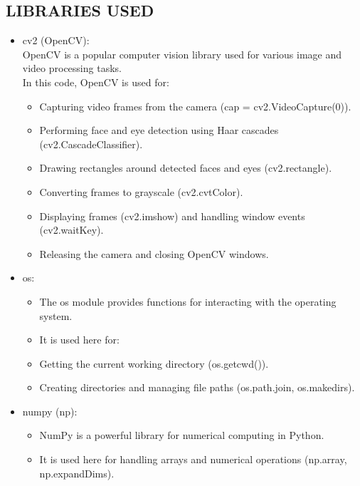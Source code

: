 \documentclass[12pt]{article}
\begin{document}
\subsection{LIBRARIES USED }
\begin{itemize}
\item cv2 (OpenCV):\\
OpenCV is a popular computer vision library used for various image and video processing tasks.\\
In this code, OpenCV is used for:
\begin{itemize}
\item Capturing video frames from the camera (cap = cv2.VideoCapture(0)).
\item Performing face and eye detection using Haar cascades (cv2.CascadeClassifier).
\item Drawing rectangles around detected faces and eyes (cv2.rectangle).
\item Converting frames to grayscale (cv2.cvtColor).
\item Displaying frames (cv2.imshow) and handling window events (cv2.waitKey).
\item Releasing the camera and closing OpenCV windows.
\end{itemize}
\item os:
\begin{itemize}
\item The os module provides functions for interacting with the operating system.
\item It is used here for:
\item Getting the current working directory (os.getcwd()).
\item Creating directories and managing file paths (os.path.join, os.makedirs).
\end{itemize}
\item numpy (np):
\begin{itemize}
\item NumPy is a powerful library for numerical computing in Python.
\item It is used here for handling arrays and numerical operations (np.array, np.expandDims).
\end{itemize}


\end{itemize}
\end{document}
